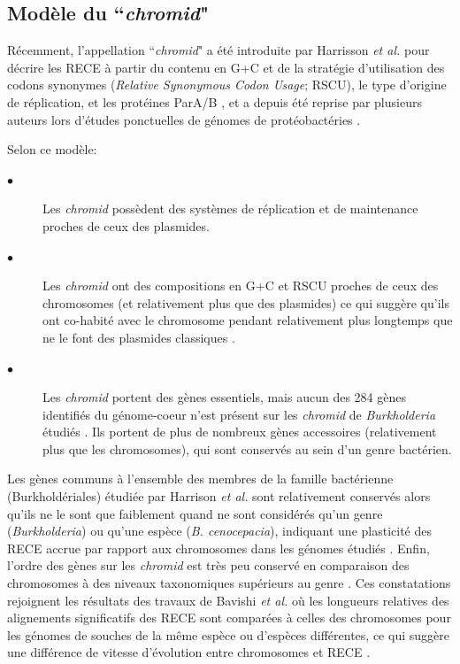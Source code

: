 	  

\subsection{Modèle du ``\textit{chromid}"}\label{parchromide}
	Récemment, l'appellation ``\textit{chromid}" a été introduite par Harrisson \textit{et al.} \citep{Harrison2010} pour décrire les RECE à partir du contenu en G+C et de la stratégie d'utilisation des codons synonymes (\textit{Relative Synonymous Codon Usage}; RSCU), le type d'origine de réplication, et les protéines ParA/B \citep{harrison2011bacterial}, et a depuis été reprise par plusieurs auteurs lors d'études ponctuelles de génomes de protéobactéries \citep{maj2013plasmids,Acosta-Cruz2012,Petersen2013,galardini2013replicon,Ramirez-Bahena2014,wisniewski2011azospirillum}.
	
	 Selon ce modèle:
\begin{description}
	\item[$\bullet$] Les \textit{chromid} possèdent des systèmes de réplication et de maintenance proches de ceux des plasmides.
	\item[$\bullet$] Les \textit{chromid} ont des compositions en G+C et RSCU proches de ceux des chromosomes (et relativement plus que des plasmides) ce qui suggère qu'ils ont co-habité avec le chromosome pendant relativement plus longtemps que ne le font des plasmides classiques \citep[Fig. 1]{Harrison2010}. 
     \item[$\bullet$] Les \textit{chromid} portent des gènes essentiels, mais aucun des 284 gènes identifiés du génome-coeur n'est présent sur les \textit{chromid} de \textit{Burkholderia} étudiés \citep{harrison2011bacterial}. Ils portent de plus de nombreux gènes accessoires (relativement plus que les chromosomes), qui sont conservés au sein d'un genre bactérien.  
\end{description}

	Les gènes communs à l'ensemble des membres de la famille bactérienne (Burkholdériales) étudiée par Harrison \textit{et al.} sont relativement conservés alors qu'ils ne le sont que faiblement quand ne sont considérés qu'un genre (\textit{Burkholderia}) ou qu'une espèce (\textit{B. cenocepacia}), indiquant une plasticité des RECE accrue par rapport aux chromosomes dans les génomes étudiés \citep[Fig. 2]{Harrison2010}. Enfin, l'ordre des gènes sur les \textit{chromid} est très peu conservé en comparaison des chromosomes à des niveaux taxonomiques supérieurs au genre  \citep{harrison2011bacterial}. Ces constatations rejoignent les résultats des travaux de Bavishi \textit{et al.} \citep{Bavishi2010} où les longueurs relatives des alignements significatifs des RECE sont comparées à celles des chromosomes pour les génomes de souches de la même espèce ou d'espèces différentes, ce qui suggère une différence de vitesse d'évolution entre chromosomes et RECE \citep{Bavishi2010}. 
    
